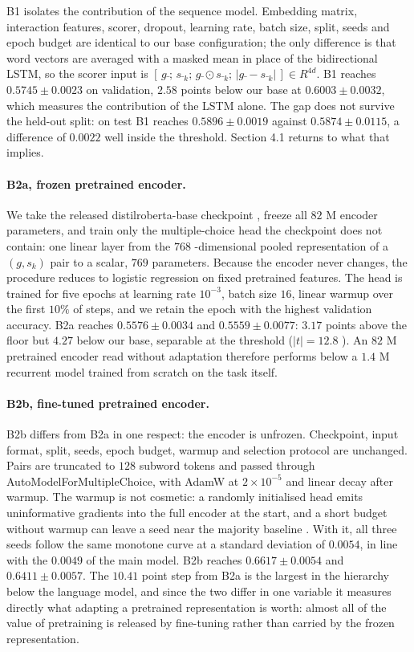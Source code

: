 \documentclass[11pt]{article}
\begin{document}
B1 isolates the contribution of the sequence model. Embedding matrix, interaction features, scorer, dropout, learning rate, batch size, split, seeds and epoch budget are identical to our base configuration; the only difference is that word vectors are averaged with a masked mean in place of the bidirectional LSTM, so the scorer input is $[\,g\bar{};\,{s\bar{}}_{k};\,g\bar{}\odot {s\bar{}}_{k};\,|g\bar{}-{s\bar{}}_{k}|\,]\in {R}^{4d}$. B1 reaches $0.5745\pm 0.0023$ on validation, $2.58$ points below our base at $0.6003\pm 0.0032$, which measures the contribution of the LSTM alone. The gap does not survive the held-out split: on test B1 reaches $0.5896\pm 0.0019$ against $0.5874\pm 0.0115$, a difference of $0.0022$ well inside the threshold. Section 4.1 returns to what that implies.

\paragraph{B2a, frozen pretrained encoder.}

We take the released distilroberta-base checkpoint \citep{sanh2019distilbert,liu2019roberta}, freeze all $82$ M encoder parameters, and train only the multiple-choice head the checkpoint does not contain: one linear layer from the $768$ -dimensional pooled representation of a $(g,{s}_{k})$ pair to a scalar, $769$ parameters. Because the encoder never changes, the procedure reduces to logistic regression on fixed pretrained features. The head is trained for five epochs at learning rate ${10}^{-3}$, batch size $16$, linear warmup over the first $10\%$ of steps, and we retain the epoch with the highest validation accuracy. B2a reaches $0.5576\pm 0.0034$ and $0.5559\pm 0.0077$: $3.17$ points above the floor but $4.27$ below our base, separable at the threshold ($|t|=12.8$ ). An $82$ M pretrained encoder read without adaptation therefore performs below a $1.4$ M recurrent model trained from scratch on the task itself.

\paragraph{B2b, fine-tuned pretrained encoder.}

B2b differs from B2a in one respect: the encoder is unfrozen. Checkpoint, input format, split, seeds, epoch budget, warmup and selection protocol are unchanged. Pairs are truncated to $128$ subword tokens and passed through AutoModelForMultipleChoice, with AdamW at $2\times {10}^{-5}$ and linear decay after warmup. The warmup is not cosmetic: a randomly initialised head emits uninformative gradients into the full encoder at the start, and a short budget without warmup can leave a seed near the majority baseline \citep{mosbach2021stability}. With it, all three seeds follow the same monotone curve at a standard deviation of $0.0054$, in line with the $0.0049$ of the main model. B2b reaches $0.6617\pm 0.0054$ and $0.6411\pm 0.0057$. The $10.41$ point step from B2a is the largest in the hierarchy below the language model, and since the two differ in one variable it measures directly what adapting a pretrained representation is worth: almost all of the value of pretraining is released by fine-tuning rather than carried by the frozen representation.
\end{document}
